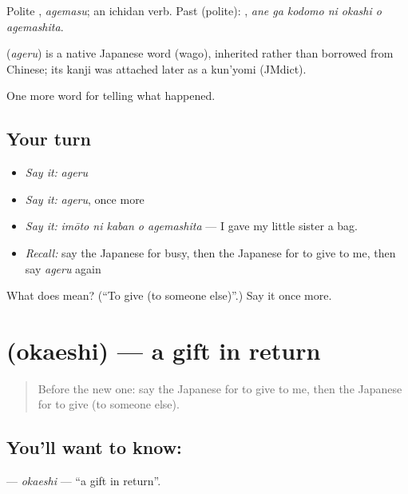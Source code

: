 Polite \textbf{}, \emph{agemasu}; an ichidan verb. Past (polite): \textbf{   }, \emph{ane ga kodomo ni okashi o agemashita}.

\begin{cousinweb}
\textbf{} (\emph{ageru}) is a native Japanese word (wago), inherited rather than borrowed from Chinese; its kanji was attached later as a kun'yomi (JMdict).
\end{cousinweb}

\begin{grammarlens}[title={What you've built}]
One more word for telling what happened.
\end{grammarlens}

\subsection*{Your turn}
\begin{itemize}
\raggedright
  \item \emph{Say it:} \emph{ageru}
  \item \emph{Say it:} \emph{ageru}, once more
  \item \emph{Say it:} \emph{imōto ni kaban o agemashita} — I gave my little sister a bag.
  \item \emph{Recall:} say the Japanese for busy, then the Japanese for to give to me, then say \emph{ageru} again
\end{itemize}

\begin{tcolorbox}[breakable,colback=teal!4,colframe=teal!35!black,title={Before you move on}]
What does  mean? (\textquotedblleft{}To give (to someone else)\textquotedblright{}.) Say it once more.
\end{tcolorbox}
\section[\texorpdfstring{\ja{おかえし} (okaeshi)}{おかえし (okaeshi)}]{ (okaeshi) — a gift in return}

\label{lesson:JA-C309-okaeshi}



\begin{quote}
Before the new one: say the Japanese for to give to me, then the Japanese for to give (to someone else).
\end{quote}

\subsection*{You'll want to know: }
\textbf{} — \emph{okaeshi} — \textquotedblleft{}a gift in return\textquotedblright{}.

